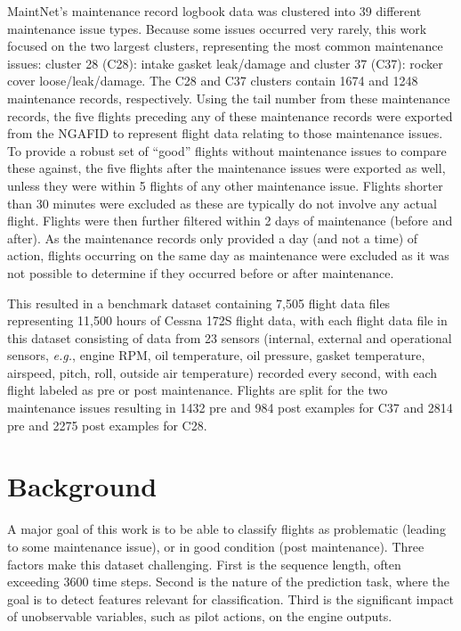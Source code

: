 \documentclass[letterpaper]{article} %
\newcommand{\eg}{{\textit{e.g.}}}
\begin{document}
MaintNet's maintenance record logbook data was clustered into 39 different maintenance issue types. Because some issues occurred very rarely, this work focused on the two largest clusters, representing the most common maintenance issues: cluster 28 (C28): intake gasket leak/damage and cluster 37 (C37): rocker cover loose/leak/damage. The C28 and C37 clusters contain 1674 and 1248 maintenance records, respectively. Using the tail number from these maintenance records, the five flights preceding any of these maintenance records were exported from the NGAFID to represent flight data relating to those maintenance issues.  To provide a robust set of ``good'' flights without maintenance issues to compare these against, the five flights after the maintenance issues were exported as well, unless they were within 5 flights of any other maintenance issue. Flights shorter than 30 minutes were excluded as these are typically do not involve any actual flight. Flights were then further filtered within 2 days of maintenance (before and after). As the maintenance records only provided a day (and not a time) of action, flights occurring on the same day as maintenance were excluded as it was not possible to determine if they occurred before or after maintenance.


This resulted in a benchmark dataset containing 7,505 flight data files representing 11,500 hours of Cessna 172S flight data, with each flight data file in this dataset consisting of data from 23 sensors (internal, external and operational sensors, \eg, engine RPM, oil temperature, oil pressure, gasket temperature, airspeed, pitch, roll, outside air temperature) recorded every second, with each flight labeled as pre or post maintenance. Flights are split for the two maintenance issues resulting in 1432 pre and 984 post examples for C37 and 2814 pre and 2275 post examples for C28.


\section{Background}

A major goal of this work is to be able to classify flights as problematic (leading to some maintenance issue), or in good condition (post maintenance). Three factors make this dataset challenging.  First is the sequence length, often exceeding 3600 time steps. Second is the nature of the prediction task, where the goal is to detect features relevant for classification. Third is the significant impact of unobservable variables, such as pilot actions, on the engine outputs.
\end{document}
